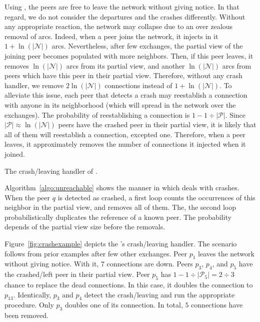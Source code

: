 Using \SPRAY, the peers are free to leave the network without giving notice. In
that regard, we do not consider the departures and the crashes differently.
Without any appropriate reaction, the network may collapse due to an over
zealous removal of arcs. Indeed, when a peer joins the network, it injects in
it $1+\ln(|\mathcal{N}|)$ arcs. Nevertheless, after few exchanges, the partial
view of the joining peer becomes populated with more neighbors. Then, if this
peer leaves, it removes $\ln(|\mathcal{N}|)$ arcs from its partial view, and
another $\ln(|\mathcal{N}|)$ arcs from peers which have this peer in their
partial view. Therefore, without any crash handler, we remove
$2\ln(|\mathcal{N}|)$ connections instead of $1+\ln(|\mathcal{N}|)$. To
alleviate this issue, each peer that detects a crash may reestablish a
connection with anyone in its neighborhood (which will spread in the network
over the exchanges). The probability of reestablishing a connection is
$1-{1\div{|\mathcal{P}|}}$. Since ${|\mathcal{P}|}\approx \ln(|\mathcal{N}|)$
peers have the crashed peer in their partial view, it is likely that all of
them will reestablish a connection, excepted one. Therefore, when a peer
leaves, it approximately removes the number of connections it injected when it
joined.

\begin{algorithm}[h]
  
  \caption{\label{algo:unreachable}The crash/leaving handler of \SPRAY.}
\end{algorithm}

Algorithm~\ref{algo:unreachable} shows the manner in which \SPRAY deals with
crashes. When the peer $q$ is detected as crashed, a first loop counts the
occurrences of this neighbor in the partial view, and removes all of them. The,
the second loop probabilistically duplicates the reference of a known peer. The
probability depends of the partial view size before the removals.

Figure~\ref{fig:crashexample} depicts the \SPRAY's crash/leaving
handler. The scenario follows from prior examples after few other
exchanges. Peer $p_1$ leaves the network without giving notice. With
it, $7$ connections are down. Peers $p_3$, $p_4$, and $p_5$ have the
crashed/left peer in their partial view. Peer $p_5$ has
$1-{1\div{|\mathcal{P}_5|}}={2\div{3}}$ chance to replace the dead
connections. In this case, it doubles the connection to
$p_{13}$. Identically, $p_3$ and $p_4$ detect the crash/leaving and
run the appropriate procedure. Only $p_3$ doubles one of its
connection. In total, $5$ connections have been removed.  

